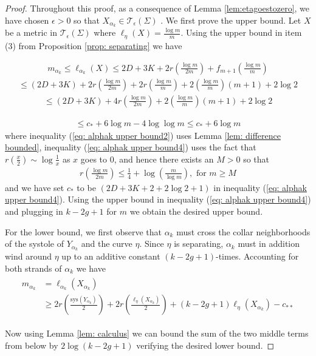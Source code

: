 \documentclass[10pt,a4paper]{amsart}
\begin{document}
\begin{proof}   Throughout this proof, as a consequence of Lemma \ref{lem:etagoestozero}, we have chosen  $\epsilon >0$
so that  $X_{\alpha_k} \in \mathcal{T}_{\epsilon}(\Sigma)$ . 
We first prove the upper bound. 
  Let $X$ be a metric in $\mathcal{T}_{\epsilon}(\Sigma)$ where $\ell_{\eta}(X)=\frac{\log m}{m}$. 
Using the upper bound in item (3) from Proposition \ref{prop: separating} we have

 
\begin{align} \label{eq: alphak upper bound}
m_{\alpha_{k}} \leq  \ell_{\alpha_{k}}(X) 
\leq
2D+ 3K + 2 r\left(\frac{\log m}{2m}\right)+
 f_{m+1}\left(\frac{\log m}{m}\right)
\end{align}
\begin{align}\label{eq: alphak upper bound2}
\leq (2D+3K)+2 r\left(\frac{\log m}{2m}\right)+2r\left(\frac{\log m}{m}\right)+2\left(\frac{\log m}{m}\right)(m+1) +2\log 2
\end{align}
\begin{align}\label{eq: alphak upper bound3}
\leq (2D+3K)+4 r\left(\frac{\log m}{2m}\right)+2\left(\frac{\log m}{m}\right)(m+1) +2\log 2
\end{align}

\begin{align} \label{eq: alphak upper bound4}
\leq  c_* + 6 \log m - 4 \log \log m \leq  c_* + 6 \log m
\end{align}
where inequality (\ref{eq: alphak upper bound2}) uses Lemma \ref{lem: difference bounded}, 
  inequality (\ref{eq: alphak upper bound4})  uses  the fact that $r(\frac{x}{2}) \sim \log \frac{1}{x}$  as $x$ goes  to $0$, and hence there exists an $M >0$ so that  \begin{align}
r\left(\frac{\log m}{2m}\right)\leq  \frac{1}{4}+\log \left(\frac{m}{\log m}\right),
\text{ for } m \geq M
\end{align}
and we have
set $c_{*}$ to be  $(2D+3K+ 2 + 2 \log 2 +1)$  in inequality  (\ref{eq: alphak upper bound4}).
Using the upper bound in inequality (\ref{eq: alphak upper bound4}) and plugging in $k-2g+1$ for $m$ we obtain the desired upper bound. 



For the lower bound,  we first observe that $\alpha_{k}$ must cross the collar neighborhoods of the systole of $Y_{\alpha_k}$ and the curve $\eta$. Since $\eta$ is separating,  $\alpha_{k}$ must in addition   wind  around  
$\eta$  up to an additive constant $(k-2g+1)$-times. Accounting for both strands of $\alpha_{k}$ we have
 \begin{align}\label{eq: better lower bound on alpha}
 \begin{split}
 m_{\alpha_{k}} &= \ell_{\alpha_{k}}(X_{\alpha_k})\\
 &\geq
2r\left(\frac{\text{sys} (Y_{\alpha_k})}{2}\right) +2r\left(\frac{\ell_{\eta}(X_{\alpha_k})}{2}\right)
  + (k-2g+1) \ell_{\eta}(X_{\alpha_k}) -c_{**}
  \end{split}
  \end{align}
  
  Now using Lemma \ref{lem: calculus} we can bound the sum of the two middle terms from below by  $2 \log (k-2g+1)$ verifying the desired lower bound. 
   \end{proof}
\end{document}
